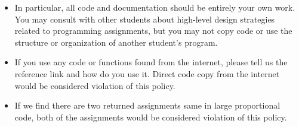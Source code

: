 \begin{itemize}
\item In particular, all code and documentation should be entirely your own work. You may consult with other students about high-level design strategies related to programming assignments, but you may not copy code or use the structure or organization of another student's program.
\item If you use any code or functions found from the internet, please tell us the reference link and how do you use it. Direct code copy from the internet would be considered violation of this policy.
\item If we find there are two returned assignments same in large proportional code, both of the assignments would be considered violation of this policy.
\end{itemize}


